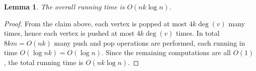 \documentclass[a4paper]{article}
\newtheorem{lemma}{Lemma}
\begin{document}
\begin{lemma}
  The overall running time is $O(nk \log n)$.
\end{lemma}
\begin{proof}
  From the claim above, each vertex is popped at most $4k\deg(v)$ many times,
  hence each vertex is pushed at most $4k\deg(v)$ times.  In total
  $8km = O(nk)$ many push and pop operations are performed, each running in
  time $O(\log nk) = O(\log n)$.  Since the remaining computations are all
  $O(1)$, the total running time is $O(nk \log n)$.
\end{proof}
\end{document}
